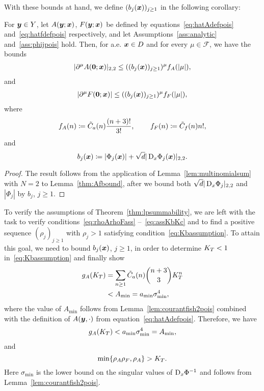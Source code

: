 With these bounds at hand, we define $(b_j({{\bm{x}}}))_{j \geq 1}$ in the following corollary:
\begin{corollary}
    \label{lm:Afbound}
    For ${\bm{y}} \in Y $, let ${A}({\bm{y}}; {{\bm{x}}})$, $F({\bm{y}}; {{\bm{x}}})$ be defined by equations~\eqref{eq:hatAdefpois} and~\eqref{eq:hatfdefpois} respectively, and let Assumptions~\ref{ass:analytic} and~\ref{ass:phijpois} hold.
    Then, for a.e. ${{\bm{x}}} \in {D}$ and for every $\mu \in \mathcal{F}$, we have the bounds
    \begin{align}
        |\partial^\mu A(\bm{0};{{\bm{x}}})|_{2,2} \leq ((b_j({{\bm{x}}}))_{j \geq 1})^\mu f_A(|\mu|),
    \end{align}
    and
    \begin{align}
        |\partial^\mu F(\bm{0};{{\bm{x}}})| \leq ((b_j({{\bm{x}}}))_{j \geq 1})^\mu f_F(|\mu|),
    \end{align}
    where
    \begin{align}
        f_A(n)\coloneqq{\tilde{C}_a}(n) \frac{(n+3)!}{3!} \text{, }\qquad f_F(n)\coloneqq{\tilde{C}_f}(n) n!,
    \end{align}
    and
    \begin{equation}
        b_j({{\bm{x}}})\coloneqq |\Phi_j ({{\bm{x}}})| + \sqrt{d}|\mathop{}\!\mathrm{D}_x\Phi_j({{\bm{x}}}) |_{2,2}\label{eq:bj_phi}.
    \end{equation}
\end{corollary}
\begin{proof}
    The result follows from the application of Lemma~\ref{lem:multinomialsum} with $N=2$ to Lemma~\ref{thm:Afbound}, after we bound both $\sqrt{d}|\mathop{}\!\mathrm{D}_x\Phi_j|_{2,2}$ and $|\Phi_j|$ by $b_j$, $j \geq 1$.
\end{proof}
To verify the assumptions of Theorem~\ref{thm:lpsummability}, we are left with the task to verify conditions~\eqref{eq:rhoArhoFass} --~\eqref{eq:assKbKc} and to find a positive sequence $(\rho_j)_{j\geq 1}$ with $\rho_j > 1$ satisfying condition~\eqref{eq:Kbassumption}.
To attain this goal, we need to bound $b_j({{\bm{x}}})$, $j \geq 1$, in order to determine $K_T < 1$ in~\eqref{eq:Kbassumption} and finally show
\begin{align}
    g_A(K_T) &= \sum_{n  \geq 1} {\tilde{C}_a}(n) \binom{n+3}{3} K_T^n\\
    &<A_{\min}
    = a_{\min}\sigma_{\min}^4, \label{eq:gAnonexplicit}
\end{align}
where the value of $A_{\min}$ follows from Lemma~\ref{lem:courantfish2pois} combined with the definition of $A({\bm{y}},\cdot)$ from equation~\eqref{eq:hatAdefpois}.
Therefore, we have
\begin{align}
    g_A(K_T) <  a_{\min}\sigma_{\min}^4  = A_{\min}\label{eq:gAdefshape},
\end{align}
and
\begin{equation*}
    \min\{\rho_A\rho_F, \rho_A\} > K_T.
\end{equation*}
Here $\sigma_{\min}$ is the lower bound on the singular values of $\mathop{}\!\mathrm{D}_x\Phi^{-1}$ and follows from Lemma~\ref{lem:courantfish2pois}.

